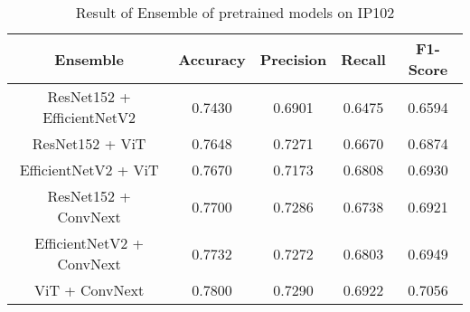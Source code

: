 \begin{table}[!htbp]
\centering
\begin{tabular}{|c|c|c|c|c|}
\hline
\textbf{Ensemble} & \textbf{Accuracy} & \textbf{Precision} & \textbf{Recall} & \textbf{F1-Score}\\
\hline
ResNet152 + EfficientNetV2 & 0.7430 & 0.6901 & 0.6475 & 0.6594\\
\hline
ResNet152 + ViT & 0.7648 & 0.7271 & 0.6670 & 0.6874\\
\hline
EfficientNetV2 + ViT & 0.7670 & 0.7173 & 0.6808 & 0.6930\\
\hline
ResNet152 + ConvNext & 0.7700 & 0.7286 & 0.6738 & 0.6921\\
\hline
EfficientNetV2 + ConvNext & 0.7732 & 0.7272 & 0.6803 & 0.6949\\
\hline
ViT + ConvNext & 0.7800 & 0.7290 & 0.6922 & 0.7056\\
\hline
\end{tabular}
\caption{Result of Ensemble of pretrained models on IP102}
\end{table}